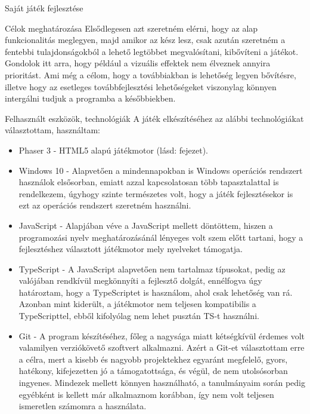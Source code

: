 \begin{MyChapter}{Saját játék fejlesztése}
\begin{MySection}{Célok meghatározása}
		Elsődlegesen azt szeretném elérni, hogy az alap funkcionalitás meglegyen, majd amikor az kész lesz, csak azután szeretném a fentebbi tulajdonságokból a lehető legtöbbet megvalósítani, kibővíteni a játékot. Gondolok itt arra, hogy például a vizuális effektek nem élveznek annyira prioritást. Ami még a célom, hogy a továbbiakban is lehetőség legyen bővítésre, illetve hogy az esetleges továbbfejlesztési lehetőségeket viszonylag könnyen intergálni tudjuk a programba a későbbiekben.
	\end{MySection}
		
	\begin{MySection}{Felhasznált eszközök, technológiák}
		A játék elkészítéséhez az alábbi technológiákat választottam, használtam:
		
		\begin{itemize}
			\item Phaser 3 - HTML5 alapú játékmotor (lásd:  fejezet).
			
			\item Windows 10 - Alapvetően a mindennapokban is Windows operációs rendszert használok elsősorban, emiatt azzal kapcsolatosan több tapasztalattal is rendelkezem, úgyhogy szinte természetes volt, hogy a játék fejlesztésekor is ezt az operációs rendszert szeretném használni.
			
			\item JavaScript - Alapjában véve a JavaScript mellett döntöttem, hiszen a programozási nyelv meghatározásánál lényeges volt szem előtt tartani, hogy a fejlesztéshez választott játékmotor mely nyelveket támogatja.
			
			\item TypeScript - A JavaScript alapvetően nem tartalmaz típusokat, pedig az valójában rendkívül megkönnyíti a fejlesztő dolgát, ennélfogva úgy határoztam, hogy a TypeScriptet is használom, ahol csak lehetőség van rá. Azonban mint kiderült, a játékmotor nem teljesen kompatibilis a TypeScripttel, ebből kifolyólag nem lehet pusztán TS-t használni.
			
			\item Git - A program készítéséhez, főleg a nagysága miatt kétségkívül érdemes volt valamilyen verziókövető szoftvert alkalmazni. Azért a Git-et választottam erre a célra, mert a kisebb és nagyobb projektekhez egyaránt megfelelő, gyors, hatékony, kifejezetten jó a támogatottsága, és végül, de nem utolsósorban ingyenes. Mindezek mellett könnyen használható, a tanulmányaim során pedig egyébként is kellett már alkalmaznom korábban, így nem volt teljesen ismeretlen számomra a használata.
			

\end{itemize}
\end{MySection}
\end{MyChapter}
